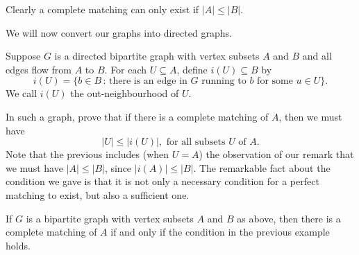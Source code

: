 \documentclass[10pt, a4paper]{article}
\begin{document}
\begin{remark}
    Clearly a complete matching can only exist if $|A| \leq |B|$.
\end{remark}

We will now convert our graphs into directed graphs.

\begin{definition}
    Suppose $G$ is a directed bipartite graph with vertex subsets $A$ and $B$ and all edges flow from $A$ to $B$.
    For each $U \subseteq A$,
    define $i(U) \subseteq B$ by
    \[
    i(U) = \{b \in B\,:\,\text{there is an edge in $G$ running to $b$ for some $u \in U$}\}.
    \]
    We call $i(U)$ the out-neighbourhood of $U$.
\end{definition}

\begin{example}
    In such a graph,
    prove that if there is a complete matching of $A$,
    then we must have
    \[
    |U| \leq |i(U)|,\text{ for all subsets $U$ of $A$}.
    \]
    Note that the previous includes
    (when $U = A$)
    the observation of our remark that we must have $|A| \leq |B|$,
    since $|i(A)| \leq |B|$.
    The remarkable fact about the condition we gave is that it is not only a necessary condition for a perfect matching to exist,
    but also a sufficient one.
\end{example}

\begin{theorem}
    If $G$ is a bipartite graph with vertex subsets $A$ and $B$ as above,
    then there is a complete matching of $A$ if and only if the condition in the previous example holds.
\end{theorem}
\end{document}
